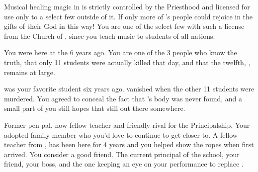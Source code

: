 \documentclass[char]{GL2020}
\begin{document}
\begin{itemz}[Notes]
	\item Musical healing magic in \pFarm{} is strictly controlled by the Priesthood and licensed for use only to a select few outside of it. If only more of \cFarmGod{}'s people could rejoice in the gifts of their God in this way! You are one of the select few with such a license from the Church of \cFarmGod{}, since you teach music to students of all nations.
	\item You were here at the \pSchool{} 6 years ago. You are one of the 3 people who know the truth, that only 11 students were actually killed that day, and that the twelfth, \cKidScientist{\full}, remains at large.
	\item \cKidScientist{\full} was your favorite student six years ago. \cKidScientist{\They} vanished when the other 11 students were murdered. You agreed to conceal the fact that \cKidScientist{}'s body was never found, and a small part of you still hopes that \cKidScientist{\theyare} still out there somewhere.
\end{itemz}

\begin{contacts}
	\contact{\cBeetle{}} Former pen-pal, now fellow teacher and friendly rival for the Principalship.
	\contact{\cAdopted{}} Your adopted family member who you'd love to continue to get closer to.
	\contact{\cInterpol{}} A fellow teacher from \pFarm{}, \cInterpol{} has been here for 4 years and you helped show \cInterpol{\them} the ropes when \cInterpol{\they} first arrived. You consider \cInterpol{\them} a good friend.
\contact{\cPrincipal{}} The current principal of the school, your friend, your boss, and the one keeping an eye on your performance to replace \cPrincipal{\them}.
\end{contacts}
\end{document}
